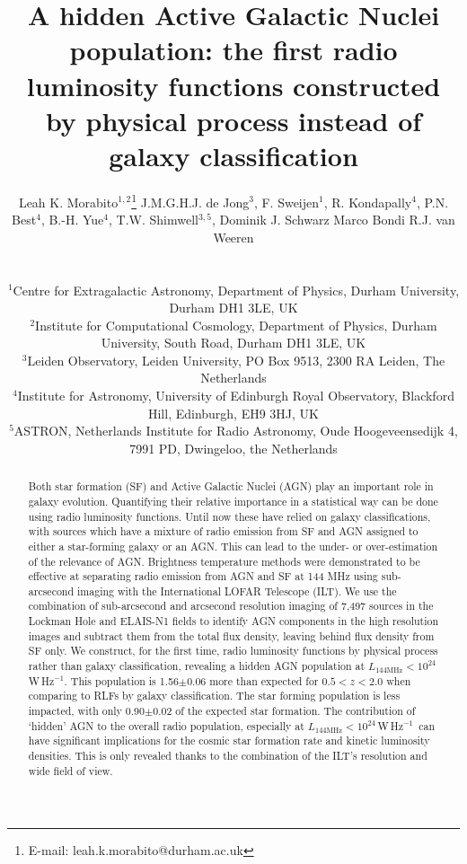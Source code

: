 \documentclass[usenatbib,fleqn,letters]{mnras}
\title[A hidden AGN population]{A hidden Active Galactic Nuclei population: the first radio luminosity functions constructed by physical process instead of galaxy classification}
\author[L.K. Morabito]{\parbox{\textwidth}{Leah K. Morabito$^{1,2}$\thanks{E-mail: leah.k.morabito@durham.ac.uk}\orcidlink{0000-0003-0487-6651}
J.M.G.H.J. de Jong$^{3}$,
F. Sweijen$^{1}$,
R. Kondapally$^{4}$,
P.N. Best$^{4}$,
B.-H. Yue$^{4}$\orcidlink{0009-0009-8935-2929}, 
T.W. Shimwell$^{3,5}$,
Dominik J. Schwarz
Marco Bondi
R.J. van Weeren
\\}\\ 
$^{1}$Centre for Extragalactic Astronomy, Department of Physics, Durham University, Durham DH1 3LE, UK \\
$^{2}$Institute for Computational Cosmology, Department of Physics, Durham University, South Road, Durham DH1 3LE, UK \\ 
$^{3}$Leiden Observatory, Leiden University, PO Box 9513, 2300 RA Leiden, The Netherlands \\
$^{4}$Institute for Astronomy, University of Edinburgh Royal Observatory, Blackford Hill, Edinburgh, EH9 3HJ, UK \\
$^{5}$ASTRON, Netherlands Institute for Radio Astronomy, Oude Hoogeveensedijk 4, 7991 PD, Dwingeloo, the Netherlands \\}
\newcommand{\wphz}{$\,$W$\,$Hz$^{-1}$}
\newcommand{\llof}{$L_{\textrm{144MHz}}$}
\begin{document}
\date{}
\pagerange{\pageref{firstpage}--\pageref{lastpage}} 
\maketitle

\label{firstpage}


\begin{abstract}
Both star formation (SF) and Active Galactic Nuclei (AGN) play an important role in galaxy evolution. Quantifying their relative importance in a statistical way can be done using radio luminosity functions. Until now these have relied on galaxy classifications, with sources which have a mixture of radio emission from SF and AGN assigned to either a star-forming galaxy or an AGN. This can lead to the under- or over-estimation of the relevance of AGN. Brightness temperature methods were demonstrated to be effective at separating radio emission from AGN and SF at 144 MHz using sub-arcsecond imaging with the International LOFAR Telescope (ILT). We use the combination of sub-arcsecond and arcsecond resolution imaging of 7,497 sources in the Lockman Hole and ELAIS-N1 fields to identify AGN components in the high resolution images and subtract them from the total flux density, leaving behind flux density from SF only. We construct, for the first time, radio luminosity functions by physical process rather than galaxy classification, revealing a hidden AGN population at \llof $<10^{24}$\wphz . This population is 1.56$\pm$0.06 more than expected for $0.5<z<2.0$ when comparing to RLFs by galaxy classification. The star forming population is less impacted, with only 0.90$\pm$0.02 of the expected star formation. The contribution of `hidden' AGN to the overall radio population, especially at \llof $<10^{24}$\wphz\ can have significant implications for the cosmic star formation rate and kinetic luminosity densities. This is only revealed thanks to the combination of the ILT's resolution and wide field of view. \vspace{3.7in}
\end{abstract}




\end{document}
